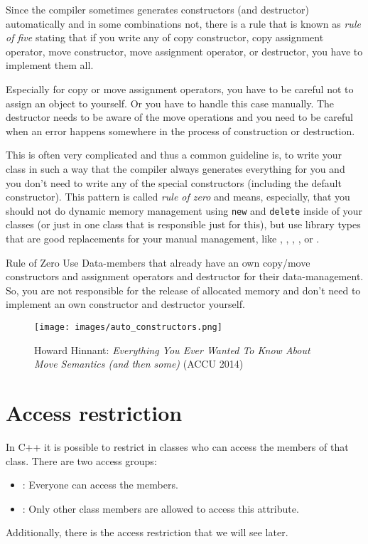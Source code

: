 Since the compiler sometimes generates constructors (and destructor) automatically and in some combinations not, there is a rule that is known as
\emph{rule of five} stating that if you write any of copy constructor, copy assignment operator, move constructor, move assignment operator, or destructor,
you have to implement them all.

Especially for copy or move assignment operators, you have to be careful not to assign an object to yourself. Or you have to handle this case manually. The
destructor needs to be aware of the move operations and you need to be careful when an error happens somewhere in the process of construction or destruction.

This is often very complicated and thus a common guideline is, to write your class in such a way that the compiler always generates everything for you and you
don't need to write any of the special constructors (including the default constructor). This pattern is called \emph{rule of zero} and means, especially,
that you should not do dynamic memory management using \texttt{new} and \texttt{delete} inside of your classes (or just in one class that is responsible just for this), but use library types that
are good replacements for your manual management, like , , , , or .

\begin{guideline}{Rule of Zero}
  Use Data-members that already have an own copy/move constructors and assignment operators and destructor for their data-management. So, you are not
  responsible for the release of allocated memory and don't need to implement an own constructor and destructor yourself.
\end{guideline}

\begin{figure}[ht]
\begin{center}
\texttt{[image: images/auto\_constructors.png]}
\caption{Howard Hinnant: \emph{Everything You Ever Wanted To Know About Move Semantics (and then some)} (ACCU 2014)}
\end{center}
\end{figure}

\section{Access restriction\label{sec:access-restriction}}
In C++ it is possible to restrict in classes who can access the members of that class. There are two access groups:
\begin{itemize}
	\item {}: Everyone can access the members.
	\item {}: Only other class members are allowed to access this attribute.
\end{itemize}
Additionally, there is the access restriction  that we will see later.

